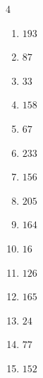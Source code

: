 \begin{multicols}{4}
\begin{enumerate}

  \item $193$


  \item $87$


  \item $33$


  \item $158$


  \item $67$


  \item $233$


  \item $156$


  \item $205$


  \item $164$


  \item $16$


\columnbreak %

  \item $126$


  \item $165$


  \item $24$


  \item $77$


  \item $152$



\end{enumerate}
\end{multicols}
